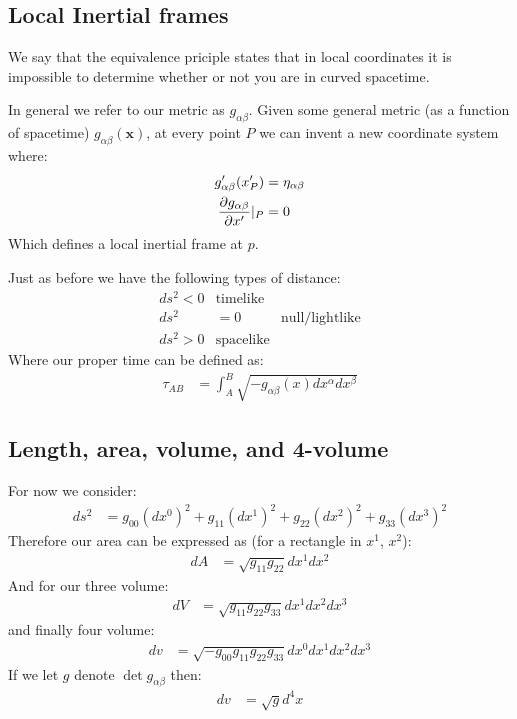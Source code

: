 \subsection{Local Inertial frames}
We say that the equivalence priciple states that in local coordinates it is impossible to determine whether or not you are in curved spacetime.

In general we refer to our metric as $g_{\alpha\beta}$. Given some general metric (as a function of spacetime) $g_{\alpha\beta}(\bm{x})$, at every point $P$ we can invent a new coordinate system where:
\begin{align*}
	g_{\alpha\beta}'(x'_P) &= \eta_{\alpha\beta} \\
	\frac{\partial g_{\alpha\beta}}{\partial x'}|_P &= 0
\end{align*}
Which defines a local inertial frame at $p$.

Just as before we have the following types of distance:
\begin{align*}
	ds^2 < 0 & \text{timelike} \\
	ds^2 &= 0 & \text{null/lightlike} \\
	ds^2 >0 & \text{spacelike}
\end{align*}
Where our proper time can be defined as:
\begin{align*}
	\tau_{AB} &= \int_A^B \sqrt{-g_{\alpha\beta}(x)dx^\alpha dx^\beta}
\end{align*}
\subsection{Length, area, volume, and 4-volume}
For now we consider:
\begin{align*}
	ds^2 &= g_{00} (dx^0)^2 + g_{11}(dx^1)^2 + g_{22} (dx^2)^2 + g_33(dx^3)^2
\end{align*}
Therefore our area can be expressed as (for a rectangle in $x^1$, $x^2$):
\begin{align*}
	dA &= \sqrt{g_{11} g_{22}} dx^1 dx^2
\end{align*}
And for our three volume:
\begin{align*}
	dV &= \sqrt{g_{11}g_{22}g_{33}} dx^1 dx^2 dx^3 
\end{align*}
and finally four volume:
\begin{align*}
	dv &= \sqrt{-g_{00}g_{11}g_{22} g_{33}}dx^0dx^1dx^2dx^3
\end{align*}
If we let $g$ denote $\det g_{\alpha\beta}$ then:
\begin{align*}
	dv &= \sqrt{g} d^4 x
\end{align*}

